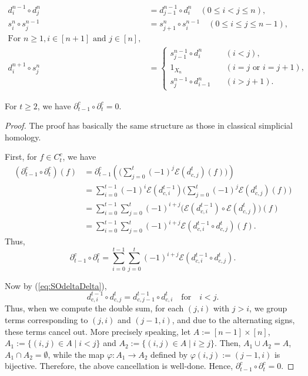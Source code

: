 \documentclass[10pt,a4paper]{amsart}
\begin{document}
\begin{align}
\label{eq:SOdeltaDelta}
d^{n-1}_i
	\circ
d^n_j
		&=
d^{n-1}_{j-1}
	\circ
d^n_i
		\quad
(0 \le i < j \le n),
		\\
\label{eq:SOsigmaSigma}
s^{n}_i
	\circ
s^{n-1}_j
		&=
s^{n}_{j+1}
	\circ
s^{n-1}_i
		\quad
(0 \le i \le j \le n-1),
		\\
		\nonumber
\textrm{For }
n \ge 1,
i \in [n+1]
\textrm{ and }
j \in [n],
		\\
\label{eq:SOsigmaDelta}
d^{n+1}_i
	\circ
s^n_j
		&=
\begin{cases}
s^{n-1}_{j-1}
	\circ
d^{n}_i
		&\quad
(i < j),
			\\
1_{X_n}
		&\quad
(i = j \textrm{ or } i = j+1),
			\\
s^{n-1}_{j}
	\circ
d^{n}_{i-1}
		&\quad
(i > j+1) .
\end{cases}
\end{align}

\begin{prop}
\label{prop:CompDiffOp}
For
$
t \ge 2
$,
we have
$
\partial^c_{t-1}
	\circ
\partial^c_t
	= 0
$.
\end{prop}

\begin{proof}
The proof has basically the same structure as those in classical simplicial homology.

First, for 
$f \in C^c_t$, we have
\begin{align*}
(\partial^c_{t-1} \circ \partial^c_t)(f)
			&=
\partial^c_{t-1}(
	\Big(
		\sum_{j=0}^{t}
			(-1)^j
			\mathcal{E}(d^t_{c,j})(f)
	\Big)
)
			\\&=
\sum_{i=0}^{t-1}
	(-1)^i
	\mathcal{E}(d^{t-1}_{c,i})
	\Big(
		\sum_{j=0}^{t}
			(-1)^j
			\mathcal{E}(d^t_{c,j})(f)
	\Big)
			\\&=
\sum_{i=0}^{t-1}
\sum_{j=0}^{t}
	(-1)^{i+j}
	\big(
		\mathcal{E}(d^{t-1}_{c,i})
			\circ
		\mathcal{E}(d^t_{c,j})
	\big)
	(f)
			\\&=
\sum_{i=0}^{t-1}
\sum_{j=0}^{t}
	(-1)^{i+j}
	\mathcal{E}(d^{t-1}_{c,i} \circ d^t_{c,j})
	(f).
\end{align*}
Thus,
\[
\partial^c_{t-1} \circ \partial^c_t
		=
\sum_{i=0}^{t-1}
\sum_{j=0}^{t}
	(-1)^{i+j}
	\mathcal{E}(d^{t-1}_{c,i} \circ d^t_{c,j}) .
\]

Now by
(\ref{eq:SOdeltaDelta}),
\[
d^{t-1}_{c,i} \circ d^t_{c,j}
	=
d^{t-1}_{c,j-1} \circ d^t_{c,i}
	\quad \textrm{for} \quad
i < j .
\]
Thus,
when we compute the double sum, for each 
$
(j, i)
$
with $j > i$,
we group terms corresponding to 
$(j, i)$
and
$(j-1, i)$,
and due to the alternating signs, these terms cancel out.
%
More precisely speaking,
let
$A := [n-1] \times [n]$,
$A_1 := \{ (i, j) \in A \mid i < j\}$
and
$A_2 := \{ (i, j) \in A \mid i \ge j\}$.
Then, 
$A_1 \cup A_2 = A$,
$A_1 \cap A_2 = \emptyset$,
while
the map
$
\varphi : A_1 \to A_2
$
defined by
$\varphi(i,j) := (j-1, i)$
is bijective.
Therefore, the above cancellation is well-done.
%
Hence,
$
\partial^c_{t-1}
	\circ
\partial^c_{t}
	= 0
$.

\end{proof}
\end{document}
